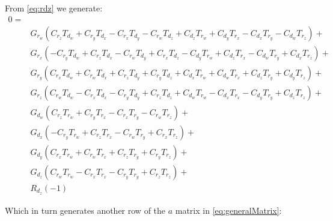 \documentclass[12pt]{article}
\begin{document}
From \autoref{eq:rdz} we generate:
\begin{equation}
    \begin{split}
0= \\&
G_{r_w} (C_{r_z} T_{d_w}+C_{r_y} T_{d_x}-C_{r_x} T_{d_y}-C_{r_w} T_{d_z}+C_{d_z} T_{r_w}+C_{d_y} T_{r_x}-C_{d_x} T_{r_y}-C_{d_w} T_{r_z})+\\&
G_{r_x} (-C_{r_y} T_{d_w}+C_{r_z} T_{d_x}-C_{r_w} T_{d_y}+C_{r_x} T_{d_z}-C_{d_y} T_{r_w}+C_{d_z} T_{r_x}-C_{d_w} T_{r_y}+C_{d_x} T_{r_z})+\\&
G_{r_y} (C_{r_x} T_{d_w}+C_{r_w} T_{d_x}+C_{r_z} T_{d_y}+C_{r_y} T_{d_z}+C_{d_x} T_{r_w}+C_{d_w} T_{r_x}+C_{d_z} T_{r_y}+C_{d_y} T_{r_z})+\\&
G_{r_z} (C_{r_w} T_{d_w}-C_{r_x} T_{d_x}-C_{r_y} T_{d_y}+C_{r_z} T_{d_z}+C_{d_w} T_{r_w}-C_{d_x} T_{r_x}-C_{d_y} T_{r_y}+C_{d_z} T_{r_z})+\\&
G_{d_w} (C_{r_z} T_{r_w}+C_{r_y} T_{r_x}-C_{r_x} T_{r_y}-C_{r_w} T_{r_z})+\\&
G_{d_x} (-C_{r_y} T_{r_w}+C_{r_z} T_{r_x}-C_{r_w} T_{r_y}+C_{r_x} T_{r_z})+\\&
G_{d_y} (C_{r_x} T_{r_w}+C_{r_w} T_{r_x}+C_{r_z} T_{r_y}+C_{r_y} T_{r_z})+\\&
G_{d_z} (C_{r_w} T_{r_w}-C_{r_x} T_{r_x}-C_{r_y} T_{r_y}+C_{r_z} T_{r_z})+\\&
 R_{d_z}(-1)
 \end{split}
 \end{equation}

 Which in turn generates another row of the $a$ matrix in \autoref{eq:generalMatrix}:
\end{document}
